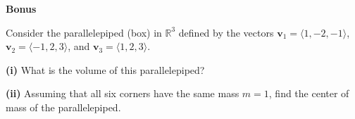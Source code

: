 \documentclass[12pt]{amsbook}
\begin{document}
\newpage

\textbf{Bonus} 

\vspace{.25cm}

Consider the parallelepiped (box) in $\mathbb{R}^3$ defined by the vectors $\textbf{v}_1 = \langle 1,-2,-1 \rangle$, $\textbf{v}_2 = \langle -1,2,3 \rangle$, and  $\textbf{v}_3 = \langle 1,2,3 \rangle$. 


\vspace{.25cm}

\textbf{(i)} What is the volume of this parallelepiped?

\vspace{5cm}

\textbf{(ii)} Assuming that all six corners have the same mass $m=1$, find the center of mass of the parallelepiped.
\end{document}
